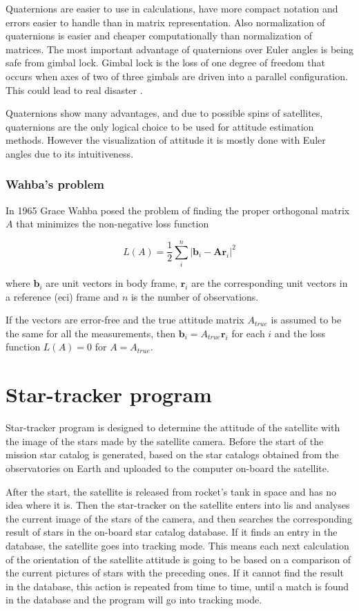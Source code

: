 \documentclass[12pt,a4paper,twoside]{article}
\begin{document}
Quaternions are easier to use in calculations, have more compact notation and errors easier to handle than in matrix representation. Also normalization of quaternions is easier and cheaper computationally than normalization of matrices.
The most important advantage of quaternions over Euler angles is being safe from gimbal lock. Gimbal lock is the loss of one degree of freedom that occurs when axes of two of three gimbals are driven into a parallel configuration. This could lead to real disaster \citet{shoemake1985animating}.

Quaternions show many advantages, and due to possible spins of satellites, quaternions are the only logical choice to be used for attitude estimation methods. However the visualization of attitude it is mostly done with Euler angles due to its intuitiveness.

\subsubsection{Wahba's problem}


In 1965 Grace Wahba posed the problem of finding the proper orthogonal matrix $A$ that minimizes the non-negative loss function\cite{wahba1965least}

\begin{equation}
L(A) = \frac{1}{2} \sum_i^n|\bm{b}_i - \bm{Ar}_i|^2
\end{equation}

where $\bm{b}_i$ are unit vectors in body frame, $\bm{r}_i$ are the corresponding unit vectors in a reference (\gls{eci}) frame and $n$ is the number of observations.

If the vectors are error-free and the true attitude matrix $A_{true}$ is assumed to be the same for all the measurements, then $\bm{b}_i = A_{true}\bm{r}_i$ for each $i$ and the loss function $L(A) = 0$ for $A = A_{true}$.


\newpage
\section{Star-tracker program}

Star-tracker program is designed to determine the attitude of the satellite with the image of the stars made by the satellite camera. Before the start of the mission star catalog is generated, based on the star catalogs obtained from the observatories on Earth and uploaded to the computer on-board the satellite. 

After the start, the satellite is released from rocket's tank in space and has no idea where it is. Then the star-tracker on the satellite enters into \gls{lis} and analyses the current image of the stars of the camera, and then searches the corresponding result of stars in the on-board star catalog database. If it finds an entry in the database, the satellite goes into tracking mode. This means each next calculation of the orientation of the satellite attitude is going to be based on a comparison of the current pictures of stars with the preceding ones. If it cannot find the result in the database, this action is repeated from time to time, until a match is found in the database and the program will go into tracking mode.
\end{document}
